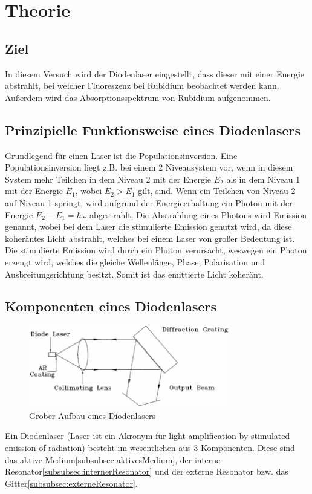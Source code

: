 \section{Theorie}
\label{sec:Theorie}
\subsection{Ziel}
\label{subsec:Ziel}
In diesem Versuch wird der Diodenlaser eingestellt, dass dieser mit einer Energie abstrahlt, bei welcher Fluoreszenz bei Rubidium beobachtet werden kann. 
Außerdem wird das Absorptionsspektrum von Rubidium aufgenommen.
\subsection{Prinzipielle Funktionsweise eines Diodenlasers}
\label{subsec:prinzipielleFunktionsweise}
Grundlegend für einen Laser ist die Populationsinversion. Eine Populationsinversion liegt z.B. bei einem 2 Niveausystem vor, wenn in diesem System mehr Teilchen
in dem Niveau 2 mit der Energie $E_2$ als in dem Niveau 1 mit der Energie $E_1$, wobei $E_2 > E_1$ gilt, sind.
Wenn ein Teilchen von Niveau 2 auf Niveau 1 springt, wird aufgrund der Energieerhaltung ein Photon mit der Energie $E_2 - E_1 = \hbar\omega$ abgestrahlt.
Die Abstrahlung eines Photons wird Emission genannt, wobei bei dem Laser die stimulierte Emission genutzt wird, da diese koheräntes Licht abstrahlt, welches bei einem Laser
von großer Bedeutung ist. 
Die stimulierte Emission wird durch ein Photon verursacht, weswegen ein Photon erzeugt wird, welches die gleiche Wellenlänge,
Phase, Polarisation und Ausbreitungsrichtung besitzt. 
Somit ist das emittierte Licht koheränt.
\subsection{Komponenten eines Diodenlasers}
\label{subsec:Komponenten}
\begin{figure}
    \centering
    \includegraphics[width = 0.78\textwidth]{pictures/komponenten.png}
    \caption{Grober Aufbau eines Diodenlasers\cite{theorie}}
    \label{pic:theorie}
\end{figure}
Ein Diodenlaser (Laser ist ein Akronym für light amplification by stimulated emission of radiation) besteht im wesentlichen aus 3 Komponenten. 
Diese sind das aktive Medium\ref{subsubsec:aktivesMedium}, der interne Resonator\ref{subsubsec:internerResonator} 
und der externe Resonator bzw. das Gitter\ref{subsubsec:externeResonator}.

